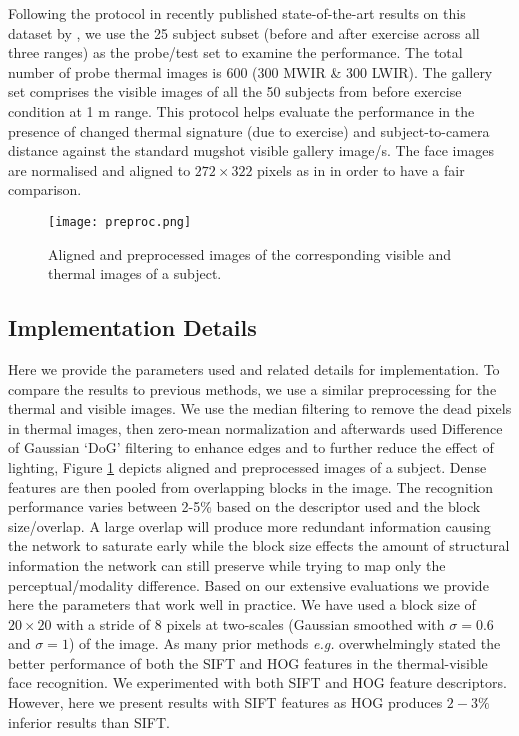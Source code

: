 \documentclass[smallextended,natbib]{svjour3}       \usepackage{graphicx}
\newcommand{\eg}{\emph{e.g.}}
\begin{document}
Following the protocol in recently published state-of-the-art results on this dataset by \cite{hu2015}, we use the 25 subject subset (before and after exercise across all three ranges) as the probe/test set to examine the performance. The total number of probe thermal images is 600 (300 MWIR \& 300 LWIR).
The gallery set comprises the visible images of all the 50 subjects from before exercise condition at 1 m range. This protocol helps evaluate the performance in the presence of changed thermal signature (due to exercise) and subject-to-camera distance against the standard mugshot visible gallery image/s. The face images are normalised and aligned to $272\times322$ pixels as in \cite{hu2015} in order to have a fair comparison.

\begin{figure}
    \texttt{[image: preproc.png]}
    \caption{Aligned and preprocessed images of the corresponding visible and thermal images of a subject.}
    \label{fig:2a}
\end{figure}
\subsection{Implementation Details}
Here we provide the parameters used and related details for implementation. To compare the results to previous methods, we use a similar preprocessing for the thermal and visible images. We use the median filtering to remove the dead pixels in thermal images, then zero-mean normalization and afterwards used Difference of Gaussian `DoG' filtering to enhance edges and to further reduce the effect of lighting, Figure \ref{fig:2a} depicts aligned and preprocessed images of a subject. Dense features are then pooled from overlapping blocks in the image. The recognition performance varies between 2-5\% based on the descriptor used and the block size/overlap. A large overlap will produce more redundant information causing the network to saturate early while the block size effects the amount of structural information the network can still preserve while trying to map only the perceptual/modality difference. Based on our extensive evaluations we provide here the parameters that work well in practice. We have used a block size of $20\times20$ with a stride of $8$ pixels at two-scales (Gaussian smoothed with $\sigma=0.6$ and $\sigma=1$) of the image. As many prior methods \eg \cite{Klare13, hu2014, hu2015, choi2012} overwhelmingly stated the better performance of both the SIFT and HOG features in the thermal-visible face recognition. We experimented with both SIFT and HOG feature descriptors. However, here we present results with SIFT features as HOG produces $2-3\%$ inferior results than SIFT.
\end{document}
